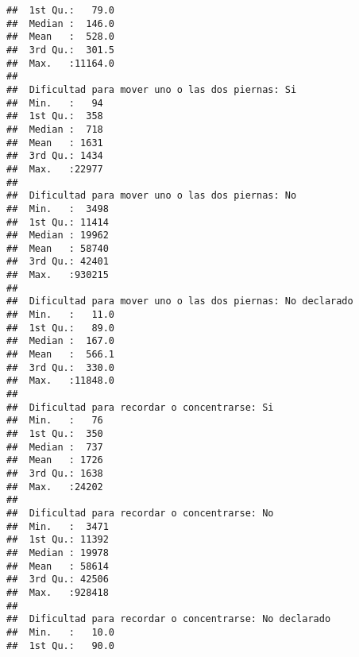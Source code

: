 \documentclass[11pt,]{article}
\begin{document}
\begin{verbatim}
##  1st Qu.:   79.0                                         
##  Median :  146.0                                         
##  Mean   :  528.0                                         
##  3rd Qu.:  301.5                                         
##  Max.   :11164.0                                         
##                                                          
##  Dificultad para mover uno o las dos piernas: Si
##  Min.   :   94                                  
##  1st Qu.:  358                                  
##  Median :  718                                  
##  Mean   : 1631                                  
##  3rd Qu.: 1434                                  
##  Max.   :22977                                  
##                                                 
##  Dificultad para mover uno o las dos piernas: No
##  Min.   :  3498                                 
##  1st Qu.: 11414                                 
##  Median : 19962                                 
##  Mean   : 58740                                 
##  3rd Qu.: 42401                                 
##  Max.   :930215                                 
##                                                 
##  Dificultad para mover uno o las dos piernas: No declarado
##  Min.   :   11.0                                          
##  1st Qu.:   89.0                                          
##  Median :  167.0                                          
##  Mean   :  566.1                                          
##  3rd Qu.:  330.0                                          
##  Max.   :11848.0                                          
##                                                           
##  Dificultad para recordar o concentrarse: Si
##  Min.   :   76                              
##  1st Qu.:  350                              
##  Median :  737                              
##  Mean   : 1726                              
##  3rd Qu.: 1638                              
##  Max.   :24202                              
##                                             
##  Dificultad para recordar o concentrarse: No
##  Min.   :  3471                             
##  1st Qu.: 11392                             
##  Median : 19978                             
##  Mean   : 58614                             
##  3rd Qu.: 42506                             
##  Max.   :928418                             
##                                             
##  Dificultad para recordar o concentrarse: No declarado
##  Min.   :   10.0                                      
##  1st Qu.:   90.0                                      

\end{verbatim}
\end{document}
